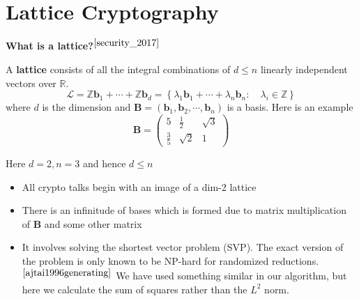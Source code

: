 \documentclass[a4paper,12pt]{article}
\begin{document}
\section{Lattice Cryptography}
\textbf{What is a lattice?}$^{\cite{security_2017}}$
\begin{flushleft}
A \textbf{lattice} consists of all the integral combinations of $d\le n$ linearly independent vectors over $\mathbb{R}$. $$\mathcal{L}=\mathbb{Z}\textbf{b}_1+\cdots+\mathbb{Z}\textbf{b}_d=\left\{\lambda_1\textbf{b}_1+\cdots+\lambda_n\textbf{b}_n:\quad \lambda_i\in\mathbb{Z}\right\}$$ where $d$ is the dimension and $\textbf{B}=\left(\textbf{b}_1,\textbf{b}_2,\cdots,\textbf{b}_n\right)$ is a basis. Here is an example $$\textbf{B}=\left(\begin{array}{ccc}5&\frac{1}{2}&\sqrt{3}\\\frac{3}{5}&\sqrt{2}&1
\end{array}\right)$$

Here $d=2,n=3$ and hence $d\le n$
\end{flushleft}

\begin{itemize}
	\item All crypto talks begin with an image of a dim-2 lattice
	\item There is an infinitude of bases which is formed due to matrix multiplication of \textbf{B} and some other matrix
	\item It involves solving the shortest vector problem (SVP). The exact version of the problem is only known to be NP-hard for randomized reductions.$^{\cite{ajtai1996generating}}$ We have used something similar in our algorithm, but here we calculate the sum of squares rather than the $L^2$ norm.
\end{itemize}
\end{document}
